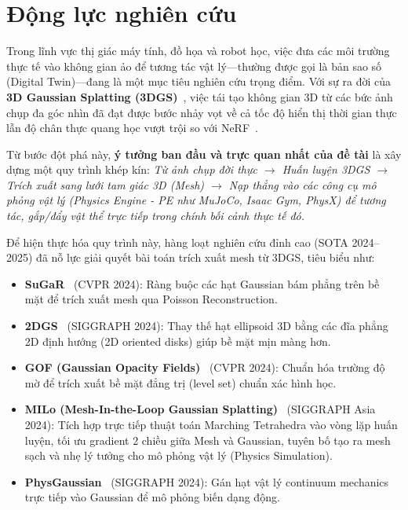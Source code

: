 \section{Động lực nghiên cứu}

Trong lĩnh vực thị giác máy tính, đồ họa và robot học, việc đưa các môi trường thực tế vào không gian ảo để tương tác vật lý—thường được gọi là bản sao số (Digital Twin)—đang là một mục tiêu nghiên cứu trọng điểm. Với sự ra đời của \textbf{3D Gaussian Splatting (3DGS)}~\cite{kerbl20233d}, việc tái tạo không gian 3D từ các bức ảnh chụp đa góc nhìn đã đạt được bước nhảy vọt về cả tốc độ hiển thị thời gian thực lẫn độ chân thực quang học vượt trội so với NeRF~\cite{mildenhall2021nerf}.

Từ bước đột phá này, \textbf{ý tưởng ban đầu và trực quan nhất của đề tài} là xây dựng một quy trình khép kín: \textit{Từ ảnh chụp đời thực $\rightarrow$ Huấn luyện 3DGS $\rightarrow$ Trích xuất sang lưới tam giác 3D (Mesh) $\rightarrow$ Nạp thẳng vào các công cụ mô phỏng vật lý (Physics Engine - PE như MuJoCo, Isaac Gym, PhysX) để tương tác, gắp/đẩy vật thể trực tiếp trong chính bối cảnh thực tế đó.}

Để hiện thực hóa quy trình này, hàng loạt nghiên cứu đỉnh cao (SOTA 2024--2025) đã nỗ lực giải quyết bài toán trích xuất mesh từ 3DGS, tiêu biểu như:
\begin{itemize}
    \item \textbf{SuGaR}~\cite{guedon2024sugar} (CVPR 2024): Ràng buộc các hạt Gaussian bám phẳng trên bề mặt để trích xuất mesh qua Poisson Reconstruction.
    \item \textbf{2DGS}~\cite{huang20242dgs} (SIGGRAPH 2024): Thay thế hạt ellipsoid 3D bằng các đĩa phẳng 2D định hướng (2D oriented disks) giúp bề mặt mịn màng hơn.
    \item \textbf{GOF (Gaussian Opacity Fields)}~\cite{yu2024gof} (CVPR 2024): Chuẩn hóa trường độ mờ để trích xuất bề mặt đẳng trị (level set) chuẩn xác hình học.
    \item \textbf{MILo (Mesh-In-the-Loop Gaussian Splatting)}~\cite{milo2024} (SIGGRAPH Asia 2024): Tích hợp trực tiếp thuật toán Marching Tetrahedra vào vòng lặp huấn luyện, tối ưu gradient 2 chiều giữa Mesh và Gaussian, tuyên bố tạo ra mesh sạch và nhẹ lý tưởng cho mô phỏng vật lý (Physics Simulation).
    \item \textbf{PhysGaussian}~\cite{xie2024physgaussian} (SIGGRAPH 2024): Gán hạt vật lý continuum mechanics trực tiếp vào Gaussian để mô phỏng biến dạng động.
\end{itemize}

